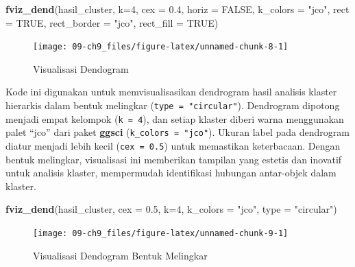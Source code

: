 \documentclass[
  oneside]{book}
\newenvironment{Shaded}{\begin{snugshade}}{\end{snugshade}}
\newcommand{\AttributeTok}[1]{\textcolor[rgb]{0.13,0.29,0.53}{#1}}
\newcommand{\ConstantTok}[1]{\textcolor[rgb]{0.56,0.35,0.01}{#1}}
\newcommand{\DecValTok}[1]{\textcolor[rgb]{0.00,0.00,0.81}{#1}}
\newcommand{\FloatTok}[1]{\textcolor[rgb]{0.00,0.00,0.81}{#1}}
\newcommand{\FunctionTok}[1]{\textcolor[rgb]{0.13,0.29,0.53}{\textbf{#1}}}
\newcommand{\NormalTok}[1]{#1}
\newcommand{\StringTok}[1]{\textcolor[rgb]{0.31,0.60,0.02}{#1}}
\begin{document}
\begin{Shaded}
\begin{Highlighting}[]
\FunctionTok{fviz\_dend}\NormalTok{(hasil\_cluster, }\AttributeTok{k=}\DecValTok{4}\NormalTok{, }\AttributeTok{cex =} \FloatTok{0.4}\NormalTok{, }\AttributeTok{horiz =} \ConstantTok{FALSE}\NormalTok{, }\AttributeTok{k\_colors =} \StringTok{"jco"}\NormalTok{,}
\AttributeTok{rect =} \ConstantTok{TRUE}\NormalTok{, }\AttributeTok{rect\_border =} \StringTok{"jco"}\NormalTok{, }\AttributeTok{rect\_fill =} \ConstantTok{TRUE}\NormalTok{)}
\end{Highlighting}
\end{Shaded}

\begin{figure}[h]

{\centering \texttt{[image: 09-ch9\_files/figure-latex/unnamed-chunk-8-1]} 

}

\caption{Visualisasi Dendogram}\label{fig:unnamed-chunk-8}
\end{figure}

Kode ini digunakan untuk memvisualisasikan dendrogram hasil analisis klaster hierarkis dalam bentuk melingkar (\texttt{type\ =\ "circular"}). Dendrogram dipotong menjadi empat kelompok (\texttt{k\ =\ 4}), dan setiap klaster diberi warna menggunakan palet ``jco'' dari paket \textbf{ggsci} (\texttt{k\_colors\ =\ "jco"}). Ukuran label pada dendrogram diatur menjadi lebih kecil (\texttt{cex\ =\ 0.5}) untuk memastikan keterbacaan. Dengan bentuk melingkar, visualisasi ini memberikan tampilan yang estetis dan inovatif untuk analisis klaster, mempermudah identifikasi hubungan antar-objek dalam klaster.

\begin{Shaded}
\begin{Highlighting}[]
\FunctionTok{fviz\_dend}\NormalTok{(hasil\_cluster, }\AttributeTok{cex =} \FloatTok{0.5}\NormalTok{, }\AttributeTok{k=}\DecValTok{4}\NormalTok{,}
\AttributeTok{k\_colors =} \StringTok{"jco"}\NormalTok{, }\AttributeTok{type =} \StringTok{"circular"}\NormalTok{)}
\end{Highlighting}
\end{Shaded}

\begin{figure}[h]

{\centering \texttt{[image: 09-ch9\_files/figure-latex/unnamed-chunk-9-1]} 

}

\caption{Visualisasi Dendogram Bentuk Melingkar}\label{fig:unnamed-chunk-9}
\end{figure}
\end{document}
